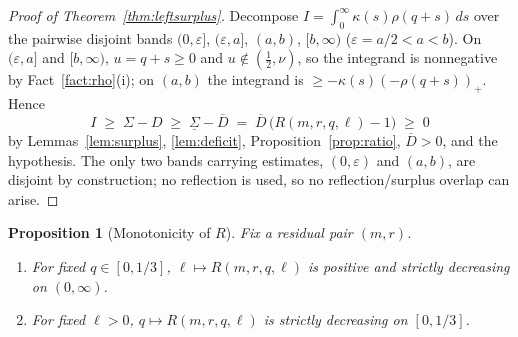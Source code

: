 \documentclass[11pt]{amsart}
\newtheorem{proposition}[theorem]{Proposition}
\theoremstyle{remark}
\begin{document}
\begin{proof}[Proof of Theorem~\ref{thm:leftsurplus}]
Decompose $I=\int_0^\infty\kappa(s)\rho(q+s)\,ds$ over the pairwise disjoint bands $(0,\varepsilon]$, $(\varepsilon,a]$, $(a,b)$, $[b,\infty)$ ($\varepsilon=a/2<a<b$).  On $(\varepsilon,a]$ and $[b,\infty)$, $u=q+s\ge0$ and $u\notin(\tfrac12,\nu)$, so the integrand is nonnegative by Fact~\ref{fact:rho}(i); on $(a,b)$ the integrand is $\ge-\kappa(s)(-\rho(q+s))_+$.  Hence
\[
        I\;\ge\;\Sigma-D\;\ge\;\underline\Sigma-\overline D
        \;=\;\overline D\,\bigl(R(m,r,q,\ell)-1\bigr)\;\ge\;0
\]
by Lemmas~\ref{lem:surplus}, \ref{lem:deficit}, Proposition~\ref{prop:ratio}, $\overline D>0$, and the hypothesis.  The only two bands carrying estimates, $(0,\varepsilon)$ and $(a,b)$, are disjoint by construction; no reflection is used, so no reflection/surplus overlap can arise.
\end{proof}

\begin{proposition}[Monotonicity of $R$]\label{prop:mono}
Fix a residual pair $(m,r)$.
\begin{enumerate}[label=\textup{(\alph*)}]
\item For fixed $q\in[0,1/3]$, $\ell\mapsto R(m,r,q,\ell)$ is positive and strictly decreasing on $(0,\infty)$.
\item For fixed $\ell>0$, $q\mapsto R(m,r,q,\ell)$ is strictly decreasing on $[0,1/3]$.
\end{enumerate}
\end{proposition}
\end{document}
